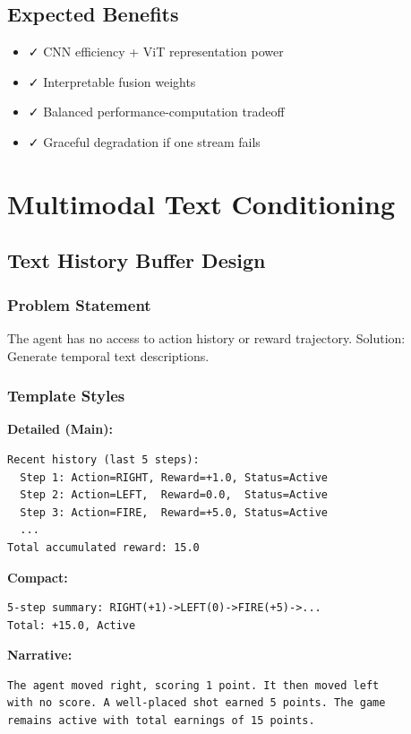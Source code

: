 \documentclass[12pt,a4paper,openany]{report}
\begin{document}
\subsection{Expected Benefits}

\begin{itemize}
    \item ✓ CNN efficiency + ViT representation power
    \item ✓ Interpretable fusion weights
    \item ✓ Balanced performance-computation tradeoff
    \item ✓ Graceful degradation if one stream fails
\end{itemize}

\section{Multimodal Text Conditioning}

\subsection{Text History Buffer Design}

\subsubsection{Problem Statement}

The agent has no access to action history or reward trajectory. Solution: Generate temporal text descriptions.

\subsubsection{Template Styles}

\textbf{Detailed (Main):}
\begin{verbatim}
Recent history (last 5 steps):
  Step 1: Action=RIGHT, Reward=+1.0, Status=Active
  Step 2: Action=LEFT,  Reward=0.0,  Status=Active
  Step 3: Action=FIRE,  Reward=+5.0, Status=Active
  ...
Total accumulated reward: 15.0
\end{verbatim}

\textbf{Compact:}
\begin{verbatim}
5-step summary: RIGHT(+1)->LEFT(0)->FIRE(+5)->...
Total: +15.0, Active
\end{verbatim}

\textbf{Narrative:}
\begin{verbatim}
The agent moved right, scoring 1 point. It then moved left
with no score. A well-placed shot earned 5 points. The game
remains active with total earnings of 15 points.
\end{verbatim}
\end{document}
